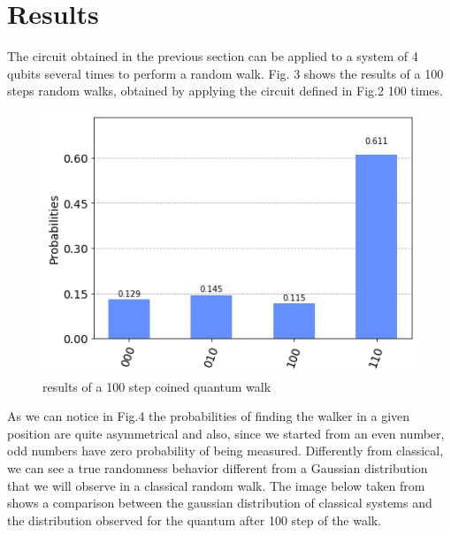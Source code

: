 \section{Results}

The circuit obtained in the previous section can be applied to a system of 4 qubits several times to perform a random walk. 
Fig. 3 shows the results of a 100 steps random walks, obtained by applying the circuit defined in Fig.2 100 times. 

\begin{figure}[h!]
    \includegraphics[scale=0.4]{img/100_steps_walk.png}
    \caption{results of a 100 step coined quantum walk}
    \centering
\end{figure}

As we can notice in Fig.4 the probabilities of finding the walker in a given position are 
quite asymmetrical and also, since we started from an even number, odd numbers have zero probability of 
being measured. Differently from classical, we can 
see a true randomness behavior different from a Gaussian distribution that we will observe in a 
classical random walk. The image below taken from \cite{Kendon2004} shows a comparison between
the gaussian distribution of classical systems and the distribution observed for the quantum after 
100 step of the walk.

